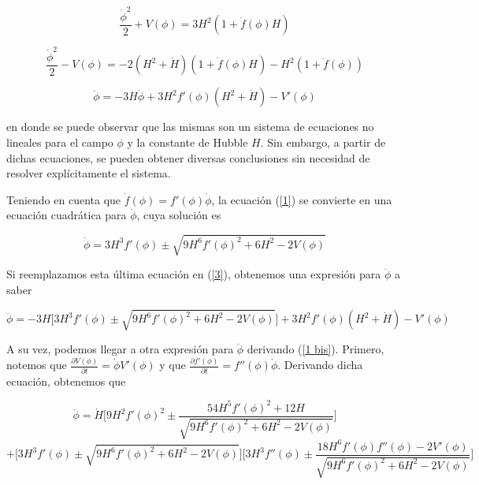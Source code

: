 \begin{equation}\label{1}
\frac{\dot{\phi}^2}{2}+V(\phi)=3H^2(1+\dot{f}(\phi)H)
\end{equation}


\begin{equation}\label{2}
\frac{\dot{\phi}^2}{2}-V(\phi)=-2(H^2+\dot{H})(1+\dot{f}(\phi)H)-H^2(1+\ddot{f}(\phi))
\end{equation}


\begin{equation}\label{3}
\ddot{\phi}=-3H\dot{\phi}+3H^2 f'(\phi)(H^2+\dot{H})-V'(\phi)
\end{equation}


en donde se puede observar que las mismas son un sistema de ecuaciones no lineales para el campo $\phi$ y la constante de Hubble $H$. Sin embargo, a partir de dichas ecuaciones, se pueden obtener diversas conclusiones sin necesidad de resolver explícitamente el sistema.

Teniendo en cuenta que $\dot{f}(\phi)=f'(\phi)\dot{\phi}$, la ecuación (\ref{1}) se convierte en una ecuación cuadrática para $\dot{\phi}$, cuya solución es

\begin{equation}\label{1 bis}
\dot{\phi}=3H^3f'(\phi)\pm \sqrt{9H^6f'(\phi)^2+6H^2-2V(\phi)}
\end{equation}

Si reemplazamos esta última ecuación en (\ref{3}), obtenemos una expresión para $\ddot{\phi}$ a saber

\begin{equation}\label{phi ddot 1}
\ddot{\phi}=-3H\bigg[3H^3f'(\phi)\pm \sqrt{9H^6f'(\phi)^2+6H^2-2V(\phi)}\bigg]+3H^2 f'(\phi)(H^2+\dot{H})-V'(\phi)
\end{equation}


A su vez, podemos llegar a otra expresión para $\ddot{\phi}$ derivando (\ref{1 bis}). Primero, notemos que $\frac{\partial V(\phi)}{\partial t}=\dot{\phi}V'(\phi)$ y que $\frac{\partial f'(\phi)}{\partial t}=f''(\phi)\dot{\phi}$. Derivando dicha ecuación, obtenemos que


$$
\ddot{\phi}=\dot{H}\bigg[9H^2 f'(\phi)^2\pm \frac{54H^5 f'(\phi)^2+12H}{\sqrt{9H^6f'(\phi)^2+6H^2-2V(\phi)}}\bigg]
$$
\begin{equation}\label{phi ddot 2}
+\bigg[3H^3f'(\phi)\pm \sqrt{9H^6f'(\phi)^2+6H^2-2V(\phi)}\bigg]\bigg[3H^3 f''(\phi)\pm \frac{18H^6 f'(\phi)f''(\phi)-2V'(\phi)}{\sqrt{9H^6f'(\phi)^2+6H^2-2V(\phi)}}\bigg]
\end{equation}



